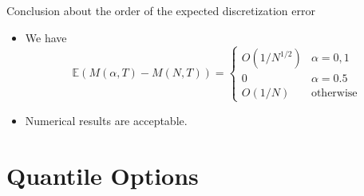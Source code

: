 \documentclass[cjk,10pt]{beamer}
\begin{document}
%
%

\begin{frame}{Conclusion about the order of the expected discretization error}
\begin{itemize}
\item
We have 
\[
\mathbb{E}\left( M(\alpha, T) - M(N,T)\right) 
= 
\begin{cases}
O(1/N^{1/2}) & \alpha=0,1\\
0 & \alpha=0.5\\
O(1/N) & \text{otherwise}
\end{cases} 
\]
\item
Numerical results are acceptable. 
\end{itemize}
\end{frame}

\section{Quantile Options}
%
\end{document}
